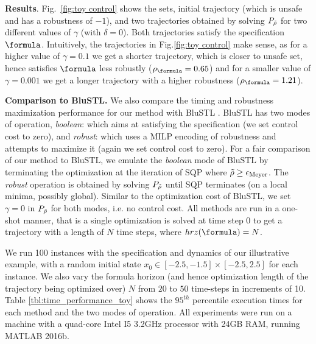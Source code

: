 \textbf{Results}.
Fig.~\ref{fig:toy control} shows the sets, initial trajectory (which is unsafe and has a robustness of $-1$), and two trajectories obtained by solving $P_{\tilde{\rho}}$ for two different values of $\gamma$ (with $\delta=0$). Both trajectories satisfy the specification $\formula$. Intuitively, the trajectories in Fig.\ref{fig:toy control} make sense, as for a higher value of $\gamma=0.1$ we get a shorter trajectory, which is closer to unsafe set, hence satisfies $\formula$ less robustly ($\rob_{\formula}=0.65$) and for a smaller value of $\gamma=0.001$ we get a longer trajectory with a higher robustness ($\rob_{\formula}=1.21$).

\textbf{Comparison to BluSTL.}
We also compare the timing and robustness maximization performance for our method with BluSTL \cite{}. BluSTL has two modes of operation, \textit{boolean}: which aims at satisfying the specification (we set control cost to zero), and \textit{robust}: which uses a MILP encoding of robustness and attempts to maximize it (again we set control cost to zero). For a fair comparison of our method to BluSTL, we emulate the \textit{boolean} mode of BluSTL by terminating the optimization at the iteration of SQP where $\tilde{\rho} \geq \epsilon_{\text{Meyer}}$. The \textit{robust} operation is obtained by solving $P_{\tilde{\rho}}$ until SQP terminates (on a local minima, possibly global). Similar to the optimization cost of BluSTL, we set $\gamma=0$ in $P_{\tilde{\rho}}$ for both modes, i.e. no control cost. All methods are run in a one-shot manner, that is a single optimization is solved at time step $0$ to get a trajectory with a length of $N$ time steps, where $hrz(\formula) = N$.

We run 100 instances with the specification and dynamics of our illustrative example, with a random initial state $x_0 \in [-2.5,-1.5] \times [-2.5,2.5]$ for each instance. We also vary the formula horizon (and hence optimization length of the trajectory being optimized over) $N$ from $20$ to $50$ time-steps in increments of 10. Table \ref{tbl:time_performance_toy} shows the $95^{th}$ percentile execution times for each method and the two modes of operation. All experiments were run on a machine with a quad-core Intel I5 3.2GHz processor with 24GB RAM, running MATLAB 2016b.


